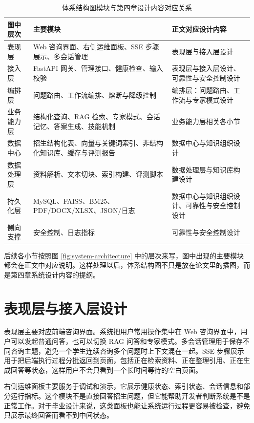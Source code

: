 \documentclass[UTF8,zihao=-4,oneside]{ctexbook}
\numberwithin{equation}{chapter}
\begin{document}
\begin{table}[H]
  \centering
  \caption{体系结构图模块与第四章设计内容对应关系}
  \begin{tabularx}{0.95\textwidth}{lYY}
    \toprule
    图中层次 & 主要模块 & 正文对应设计内容 \\
    \midrule
    表现层 & Web 咨询界面、右侧运维面板、SSE 步骤展示、多会话管理 & 表现层与接入层设计 \\
    接入层 & FastAPI 网关、管理接口、健康检查、输入校验 & 表现层与接入层设计、可靠性与安全控制设计 \\
    编排层 & 问题路由、工作流编排、熔断与降级控制 & 编排层：问题路由、工作流与专家模式设计 \\
    业务能力层 & 结构化查询、RAG 检索、专家模式、会话记忆、答案生成、技能机制 & 业务能力层相关各小节 \\
    数据中心 & 招生结构化表、向量与关键词索引、非结构化知识库、缓存与评测报告 & 数据中心与知识组织设计 \\
    数据处理层 & 资料解析、文本切块、索引构建、评测脚本 & 数据处理层与知识库构建设计 \\
    持久化层 & MySQL、FAISS、BM25、PDF/DOCX/XLSX、JSON/日志 & 数据中心与知识组织设计、可靠性与安全控制设计 \\
    侧向支撑 & 安全控制、日志指标 & 可靠性与安全控制设计 \\
    \bottomrule
  \end{tabularx}
\end{table}

后续各小节按照图 \ref{fig:system-architecture} 中的层次来写，图中出现的主要模块都会在正文中对应说明。这样处理以后，体系结构图不只是放在论文里的插图，而是第四章系统设计内容的提纲。

\section{表现层与接入层设计}
表现层主要对应前端咨询界面。系统把用户常用操作集中在 Web 咨询界面中，用户可以发起普通问答，也可以切换 RAG 问答和专家模式。多会话管理用于保存不同咨询主题，避免一个学生连续咨询多个问题时上下文混在一起。SSE 步骤展示用于把后端执行过程分批返回到页面，包括正在检索资料、正在整理引用、正在生成回答等状态，这样用户不会只看到一个长时间等待的空白页面。

右侧运维面板主要服务于调试和演示，它展示健康状态、索引状态、会话信息和部分运行指标。这个模块不是直接回答招生问题，但它能帮助开发者判断系统是不是正常工作。对于毕业设计来说，这类面板也能让系统运行过程更容易被检查，避免只展示最终回答而看不到中间状态。
\end{document}
